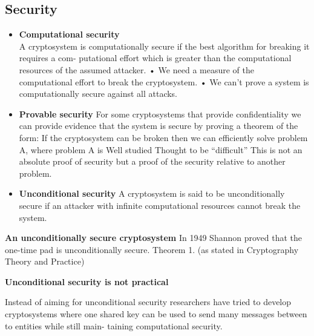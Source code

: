 \subsection{Security}
\begin{itemize}
    \item \textbf{Computational security}\\
        A cryptosystem is computationally secure if the best algorithm for breaking it requires a com- putational effort which is greater than the computational resources of the assumed attacker.
        • We need a measure of the computational effort to break the cryptosystem. • We can’t prove a system is computationally secure against all attacks.

    \item \textbf{Provable security}
        For some cryptosystems that provide confidentiality we can provide evidence that the system is secure by proving a theorem of the form:
        If the cryptosystem can be broken then we can efficiently solve problem A, where problem A is
        Well studied
        Thought to be “difficult”
        This is not an absolute proof of security but a proof of the security relative to another problem.

    \item \textbf{Unconditional security}
        A cryptosystem is said to be unconditionally secure if an attacker with infinite computational resources cannot break the system.

\end{itemize}

\textbf{An unconditionally secure cryptosystem}
In 1949 Shannon proved that the one-time pad is unconditionally secure.
Theorem 1.
(as stated in Cryptography Theory and Practice)

\textbf{Unconditional security is not practical}

Instead of aiming for unconditional security researchers have tried to develop cryptosystems where one shared key can be used to send many messages between to entities while still main- taining computational security.
